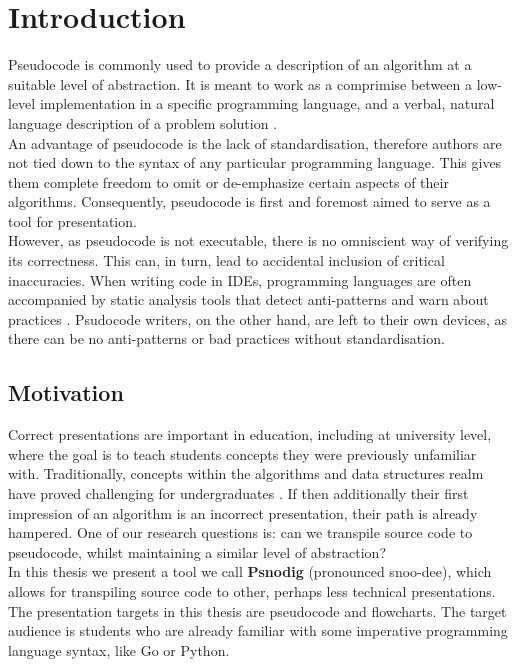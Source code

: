 \chapter{Introduction}

Pseudocode is commonly used to provide a description of an algorithm at a suitable level of abstraction. It is meant to work as a comprimise between a low-level implementation in a specific programming language, and a verbal, natural language description of a problem solution \cite{LinfoAlgorithmsIntro2007}. \hfill \\

An advantage of pseudocode is the lack of standardisation, therefore authors are not tied down to the syntax of any particular programming language. This gives them complete freedom to omit or de-emphasize certain aspects of their algorithms. Consequently, pseudocode is first and foremost aimed to serve as a tool for presentation. \hfill \\

However, as pseudocode is not executable, there is no omniscient way of verifying its correctness. This can, in turn, lead to accidental inclusion of critical inaccuracies. %
When writing code in IDEs, programming languages are often accompanied by static analysis tools that detect anti-patterns and warn about practices \cite{linter}. Psudocode writers, on the other hand, are left to their own devices, as there can be no anti-patterns or bad practices without standardisation.

\section{Motivation}

Correct presentations are important in education, including at university level, where the goal is to teach students concepts they were previously unfamiliar with. Traditionally, concepts within the algorithms and data structures realm have proved challenging for undergraduates \cite{10.1145/2157136.2157148}. If then additionally their first impression of an algorithm is an incorrect presentation, their path is already hampered. One of our research questions is: can we transpile source code to pseudocode, whilst maintaining a similar level of abstraction? \hfill \\

In this thesis we present a tool we call \textbf{Psnodig} (pronounced snoo-dee), which allows for transpiling source code to other, perhaps less technical presentations. The presentation targets in this thesis are pseudocode and flowcharts. The target audience is students who are already familiar with some imperative programming language syntax, like Go or Python. \hfill \\

